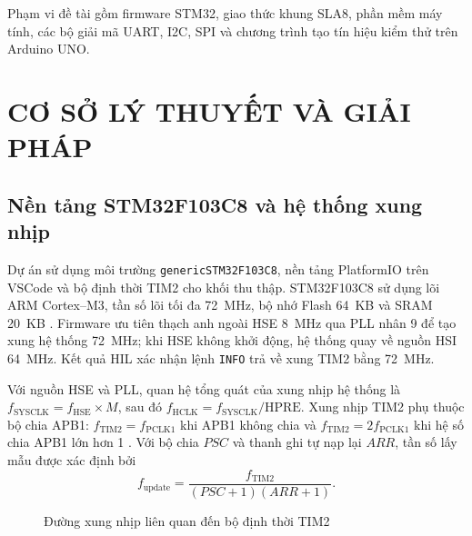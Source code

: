 Phạm vi đề tài gồm firmware STM32, giao thức khung SLA8, phần mềm máy tính, các bộ giải mã UART, I2C, SPI và chương trình tạo tín hiệu kiểm thử trên Arduino UNO.

\chapter{CƠ SỞ LÝ THUYẾT VÀ GIẢI PHÁP}\label{chap:theory}

\section{Nền tảng STM32F103C8 và hệ thống xung nhịp}\label{sec:stm32-clock}

Dự án sử dụng môi trường \texttt{genericSTM32F103C8}, nền tảng PlatformIO trên VSCode và bộ định thời TIM2 cho khối thu thập. STM32F103C8 sử dụng lõi ARM Cortex--M3, tần số lõi tối đa 72~MHz, bộ nhớ Flash 64~KB và SRAM 20~KB \cite{st-ds5319}. Firmware ưu tiên thạch anh ngoài HSE 8~MHz qua PLL nhân 9 để tạo xung hệ thống 72~MHz; khi HSE không khởi động, hệ thống quay về nguồn HSI 64~MHz. Kết quả HIL xác nhận lệnh \texttt{INFO} trả về xung TIM2 bằng 72~MHz.

Với nguồn HSE và PLL, quan hệ tổng quát của xung nhịp hệ thống là \(f_{\mathrm{SYSCLK}}=f_{\mathrm{HSE}}\times M\), sau đó \(f_{\mathrm{HCLK}}=f_{\mathrm{SYSCLK}}/\mathrm{HPRE}\). Xung nhịp TIM2 phụ thuộc bộ chia APB1: \(f_{\mathrm{TIM2}}=f_{\mathrm{PCLK1}}\) khi APB1 không chia và \(f_{\mathrm{TIM2}}=2f_{\mathrm{PCLK1}}\) khi hệ số chia APB1 lớn hơn 1 \cite{st-rm0008}. Với bộ chia \(PSC\) và thanh ghi tự nạp lại \(ARR\), tần số lấy mẫu được xác định bởi
\[
 f_{\mathrm{update}}=\frac{f_{\mathrm{TIM2}}}{(PSC+1)(ARR+1)}.
\]

\begin{figure}[H]
\centering
{}
\caption{Đường xung nhịp liên quan đến bộ định thời TIM2}
\label{fig:clock-tree}
\end{figure}

